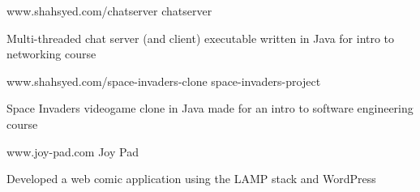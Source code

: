 \begin{cventries}
  \cventry
    {www.shahsyed.com/chatserver}
    {chatserver}
    { }
    { }
    {
      \begin{cvitems}
        \item {Multi-threaded chat server (and client) executable written in Java for intro to networking course}
      \end{cvitems}
    }
    \cventry
    {www.shahsyed.com/space-invaders-clone}
    {space-invaders-project}
    { }
    { }
    {
      \begin{cvitems}
        \item {Space Invaders videogame clone in Java made for an intro to software engineering course}
      \end{cvitems}
    }
   \cventry
    {www.joy-pad.com}
    {Joy Pad}
    { }
    { }
    {
      \begin{cvitems}
        \item {Developed a web comic application using the LAMP stack and WordPress}
      \end{cvitems}
    }
\end{cventries}
